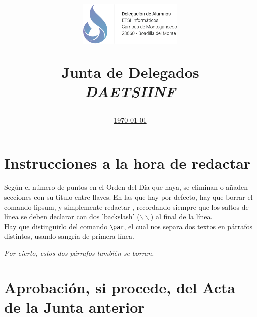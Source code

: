 \documentclass[12pt,spanish,a4paper]{article}
\title{
  \begin{flushright}
    \includegraphics[width=5cm]{include/daetsiinf-header.png}
  \end{flushright}
  \textbf{Junta de Delegados}\\
	\emph{DAETSIINF}}
\author{}
\date{\underline{\today}}
\begin{document}
	\maketitle
	\thispagestyle{empty}
	\renewcommand*\contentsname{Orden del día}
	\tableofcontents
	\pagebreak
    \section*{Instrucciones a la hora de redactar}
      Según el número de puntos en el Orden del Día que haya, se eliminan o añaden secciones con su título entre llaves.
      En las que hay por defecto, hay que borrar el comando lipsum, y simplemente redactar , recordando siempre que los saltos de línea se deben declarar con dos 'backslash' ($\backslash \backslash$) al
      final de la línea. \\
      Hay que distinguirlo del comando \verb=\par=, el cual nos separa dos textos en párrafos distintos, usando sangría de primera línea.\par
      \textit{Por cierto, estos dos párrafos también se borran.}
    \section{Aprobación, si procede, del Acta de la Junta anterior}
      \lipsum[1]
    \newpage
    \section{}
      \lipsum[2]
    \newpage
    \section{}
      \lipsum[3]
    \newpage
    \section{}
      \lipsum[4]
    \newpage
    \section{}
      \lipsum[5]
    \newpage
    \section{}
      \lipsum[6]
    \newpage
\end{document}
